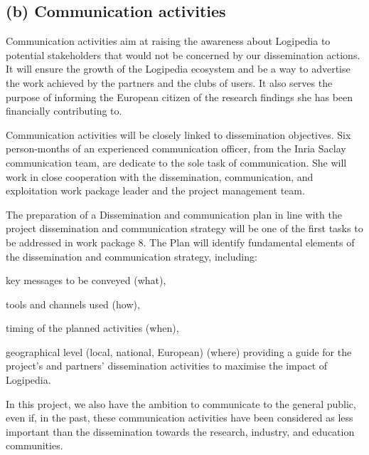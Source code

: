 \subsection*{(b) Communication activities}

Communication activities aim at raising the awareness about Logipedia
to potential stakeholders that would not be concerned by our
dissemination actions. It will ensure the growth of the Logipedia
ecosystem and be a way to advertise the work achieved by the partners
and the clubs of users. It also serves the purpose of informing the
European citizen of the research findings she has been financially
contributing to.

Communication activities will be closely linked to dissemination
objectives.  Six person-months of an experienced communication
officer, from the Inria Saclay communication team, are dedicate to the
sole task of communication.  She will work in close cooperation with
the dissemination, communication, and exploitation work package
leader and the project management team.

The preparation of a Dissemination and communication plan in line with
the project dissemination and communication strategy will be one of
the first tasks to be addressed in work package 8. The Plan will identify
fundamental elements of the dissemination and communication strategy,
including:
\begin{compactitem}
\item key messages to be conveyed (what),
\item tools and channels used (how),
\item timing of the planned activities (when),
\item geographical level (local, national, European) (where) providing
  a guide for the project's and partners' dissemination activities to
  maximise the impact of Logipedia.
\end{compactitem}

In this project, we also have the ambition to communicate to the
general public, even if, in the past, these communication activities
have been considered as less important than the dissemination towards
the research, industry, and education communities.

